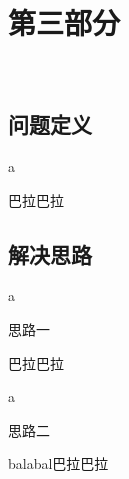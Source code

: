 \section{第三部分}
\
\subsection{问题定义}
\begin{frame}{a}
	\begin{defi}
		巴拉巴拉
	\end{defi}
\end{frame}
\subsection{解决思路}
\begin{frame}{a}
	\begin{solu}
		思路一
	\end{solu}
	\vspace{1.4cm}
	巴拉巴拉
\end{frame}

\begin{frame}{a}	
	\setcounter{solu}{1}
	\begin{solu}
		思路二
	\end{solu}
	\vspace{1.4cm}
	balabal巴拉巴拉
\end{frame}
